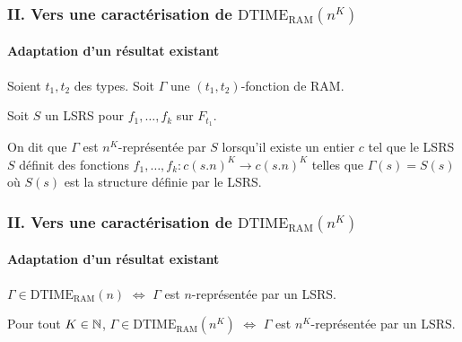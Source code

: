 \documentclass[10pt]{beamer}
\newcommand{\dtimeram}{\text{DTIME}_{\text{RAM}}\left( n^K \right)}
\begin{document}
	
	
	\begin{frame}
		\frametitle{II. Vers une caractérisation de $\dtimeram$}
		\framesubtitle{Adaptation d'un résultat existant}
		
		\begin{defn}
			\label{def:representee_par_LSRS}
			Soient $t_1, t_2$ des types. Soit $\Gamma$ une $(t_1, t_2)$-fonction de RAM.
			
			Soit $S$ un LSRS pour $f_1, \dots, f_k$ sur $F_{t_1}$. 
			
			On dit que $\Gamma$ est $n^K$-représentée par $S$ lorsqu'il existe un entier $c$ tel que le LSRS $S$ définit des fonctions $f_1, \dots, f_k : c (s.n)^K \to c (s.n)^K$ telles que $\Gamma(s) = S(s)$ où $S(s)$ est la structure définie par le LSRS.
		\end{defn}
	\end{frame}
	
	\begin{frame}
		\frametitle{II. Vers une caractérisation de $\dtimeram$}
		\framesubtitle{Adaptation d'un résultat existant}
		
		\begin{thm}
			$\Gamma \in \text{DTIME}_{\text{RAM}}\left( n \right)$ $\Leftrightarrow$ $\Gamma$ est $n$-représentée par un LSRS.
		\end{thm}
		
		\espace 
		
		\pause 
		
		\begin{thm}
			Pour tout $K \in \mathbb{N}$, $\Gamma \in \text{DTIME}_{\text{RAM}}\left( n^K \right)$ $\Leftrightarrow$ $\Gamma$ est $n^K$-représentée par un LSRS.
		\end{thm}
	\end{frame}
	
	
\end{document}
